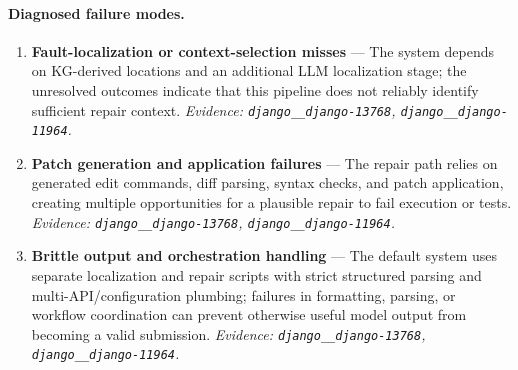 \paragraph{Diagnosed failure modes.}\begin{enumerate}\itemsep1pt
\item \textbf{Fault-localization or context-selection misses} --- The system depends on KG-derived locations and an additional LLM localization stage; the unresolved outcomes indicate that this pipeline does not reliably identify sufficient repair context. \emph{Evidence: \texttt{django\_\_django-13768}, \texttt{django\_\_django-11964}.}
\item \textbf{Patch generation and application failures} --- The repair path relies on generated edit commands, diff parsing, syntax checks, and patch application, creating multiple opportunities for a plausible repair to fail execution or tests. \emph{Evidence: \texttt{django\_\_django-13768}, \texttt{django\_\_django-11964}.}
\item \textbf{Brittle output and orchestration handling} --- The default system uses separate localization and repair scripts with strict structured parsing and multi-API/configuration plumbing; failures in formatting, parsing, or workflow coordination can prevent otherwise useful model output from becoming a valid submission. \emph{Evidence: \texttt{django\_\_django-13768}, \texttt{django\_\_django-11964}.}
\end{enumerate}
